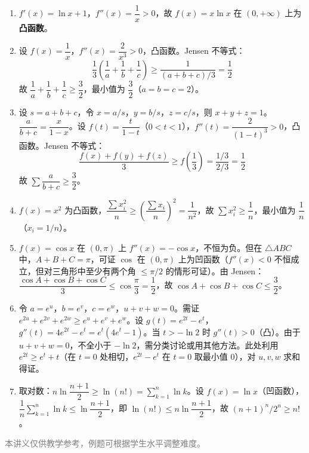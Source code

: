 \documentclass[12pt, a4paper]{ctexart}
\begin{document}
\begin{knowledgebox}[参考答案]
\begin{enumerate}
  \item $f'(x) = \ln x + 1$，$f''(x) = \dfrac{1}{x} > 0$，故 $f(x) = x\ln x$ 在 $(0, +\infty)$ 上为\textbf{凸函数}。

  \item 设 $f(x) = \dfrac{1}{x}$，$f''(x) = \dfrac{2}{x^3} > 0$，凸函数。Jensen 不等式：
  $$\frac{1}{3}\left(\frac{1}{a} + \frac{1}{b} + \frac{1}{c}\right) \geq \frac{1}{(a + b + c)/3} = \frac{1}{2}$$
  故 $\dfrac{1}{a} + \dfrac{1}{b} + \dfrac{1}{c} \geq \dfrac{3}{2}$，最小值为 $\dfrac{3}{2}$（$a = b = c = 2$）。

  \item 设 $s = a + b + c$，令 $x = a/s$，$y = b/s$，$z = c/s$，则 $x + y + z = 1$。$\dfrac{a}{b + c} = \dfrac{x}{1 - x}$。设 $f(t) = \dfrac{t}{1 - t}$（$0 < t < 1$），$f''(t) = \dfrac{2}{(1 - t)^3} > 0$，凸函数。Jensen 不等式：
  $$\frac{f(x) + f(y) + f(z)}{3} \geq f\!\left(\frac{1}{3}\right) = \frac{1/3}{2/3} = \frac{1}{2}$$
  故 $\sum \dfrac{a}{b + c} \geq \dfrac{3}{2}$。

  \item $f(x) = x^2$ 为凸函数，$\dfrac{\sum x_i^2}{n} \geq \left(\dfrac{\sum x_i}{n}\right)^2 = \dfrac{1}{n^2}$，故 $\sum x_i^2 \geq \dfrac{1}{n}$，最小值为 $\dfrac{1}{n}$（$x_i = 1/n$）。

  \item $f(x) = \cos x$ 在 $(0, \pi)$ 上 $f''(x) = -\cos x$，不恒为负。但在 $\triangle ABC$ 中，$A + B + C = \pi$，可证 $\cos$ 在 $(0, \pi)$ 上为凹函数（$f''(x) < 0$ 不恒成立，但对三角形中至少有两个角 $\leq \pi/2$ 的情形可证）。由 Jensen：$\dfrac{\cos A + \cos B + \cos C}{3} \leq \cos\dfrac{\pi}{3} = \dfrac{1}{2}$，故 $\cos A + \cos B + \cos C \leq \dfrac{3}{2}$。

  \item 令 $a = e^u$，$b = e^v$，$c = e^w$，$u + v + w = 0$。需证 $e^{2u} + e^{2v} + e^{2w} \geq e^u + e^v + e^w$。设 $g(t) = e^{2t} - e^t$，$g''(t) = 4e^{2t} - e^t = e^t(4e^t - 1)$。当 $t > -\ln 2$ 时 $g''(t) > 0$（凸）。由于 $u + v + w = 0$，不全小于 $-\ln 2$，需分类讨论或用其他方法。此处利用 $e^{2t} \geq e^t + t$（在 $t = 0$ 处相切，$e^{2t} - e^t$ 在 $t = 0$ 取最小值 $0$），对 $u, v, w$ 求和得证。

  \item 取对数：$n\ln\dfrac{n + 1}{2} \geq \ln(n!) = \sum_{k=1}^n \ln k$。设 $f(x) = \ln x$（凹函数），$\dfrac{1}{n}\sum_{k=1}^n \ln k \leq \ln\dfrac{n + 1}{2}$，即 $\ln(n!) \leq n\ln\dfrac{n + 1}{2}$，故 $(n + 1)^n / 2^n \geq n!$。
\end{enumerate}
\end{knowledgebox}

\vfill
\begin{center}
\small\textcolor{gray}{本讲义仅供教学参考，例题可根据学生水平调整难度。}
\end{center}
\end{document}

